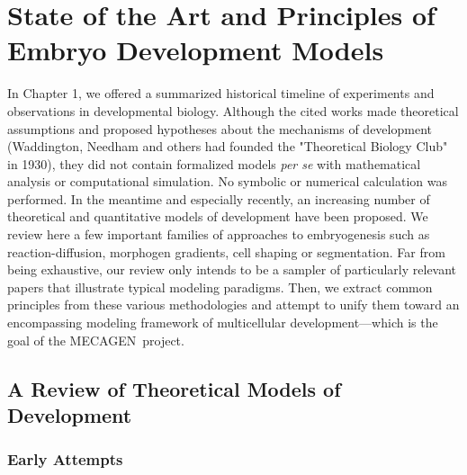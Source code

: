 

\section{State of the Art and Principles of Embryo Development Models  }

  In Chapter 1, we offered a summarized historical timeline of experiments and observations in developmental biology. Although the cited works made theoretical assumptions and proposed hypotheses about the mechanisms of development (Waddington, Needham and others had founded the "Theoretical Biology Club" in 1930), they did not contain formalized models \textit{per se} with mathematical analysis or computational simulation. No symbolic or numerical calculation was performed. In the meantime and especially recently, an increasing number of theoretical and quantitative models of development have been proposed. We review here a few important families of approaches to embryogenesis such as reaction-diffusion, morphogen gradients, cell shaping or segmentation. Far from being exhaustive, our review only intends to be a sampler of particularly relevant papers that illustrate typical modeling paradigms. Then, we extract common principles from these various methodologies and attempt to unify them toward an encompassing modeling framework of multicellular development---which is the goal of the MECAGEN project. 

\subsection{A Review of Theoretical Models of Development }

\subsubsection{Early Attempts}

